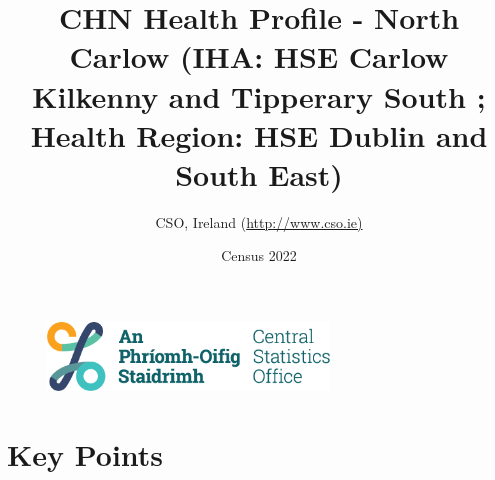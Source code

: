 \documentclass{article}
\title{CHN Health Profile - North Carlow (IHA: HSE Carlow Kilkenny and Tipperary South ;  Health Region: HSE Dublin and South East) }
\date{Census 2022}
\author{CSO, Ireland  (\url{http://www.cso.ie)}}
\begin{document}


\begin{figure}
	\centering
\includegraphics[width =75mm]{../figures/CSO_Logo.png}
\end{figure}

				 
		   
						  
														  
																																													
												 
			 
\maketitle
					
													   
				 
						 
																																																																											   
				 
				  
  \pagebreak
    	    \tableofcontents

\pagebreak


\section{Key Points}
\end{document}
